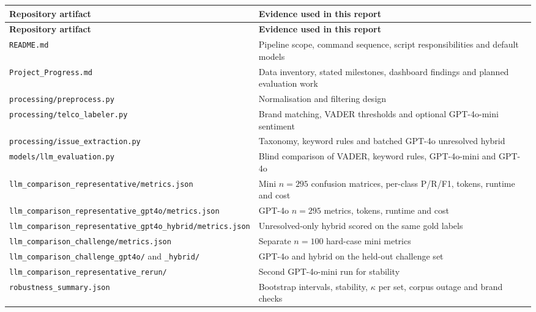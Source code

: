 \documentclass[11pt,a4paper]{article}
\begin{document}
\begin{longtable}{@{}p{}p{}@{}}
\toprule
\textbf{Repository artifact} & \textbf{Evidence used in this report} \\
\midrule
\endfirsthead
\toprule
\textbf{Repository artifact} & \textbf{Evidence used in this report} \\
\midrule
\endhead
\texttt{README.md} & Pipeline scope, command sequence, script responsibilities and default models \\
\texttt{Project\_\allowbreak{}Progress.md} & Data inventory, stated milestones, dashboard findings and planned evaluation work \\
\texttt{processing/\allowbreak{}preprocess.py} & Normalisation and filtering design \\
\texttt{processing/\allowbreak{}telco\_\allowbreak{}labeler.py} & Brand matching, VADER thresholds and optional GPT-4o-mini sentiment \\
\texttt{processing/\allowbreak{}issue\_\allowbreak{}extraction.py} & Taxonomy, keyword rules and batched GPT-4o unresolved hybrid \\
\texttt{models/\allowbreak{}llm\_\allowbreak{}evaluation.py} & Blind comparison of VADER, keyword rules, GPT-4o-mini and GPT-4o \\
\texttt{llm\_\allowbreak{}comparison\_\allowbreak{}representative/\allowbreak{}metrics.json} & Mini $n=295$ confusion matrices, per-class P/R/F1, tokens, runtime and cost \\
\texttt{llm\_\allowbreak{}comparison\_\allowbreak{}representative\_\allowbreak{}gpt4o/\allowbreak{}metrics.json} & GPT-4o $n=295$ metrics, tokens, runtime and cost \\
\texttt{llm\_\allowbreak{}comparison\_\allowbreak{}representative\_\allowbreak{}gpt4o\_\allowbreak{}hybrid/\allowbreak{}metrics.json} & Unresolved-only hybrid scored on the same gold labels \\
\texttt{llm\_\allowbreak{}comparison\_\allowbreak{}challenge/\allowbreak{}metrics.json} & Separate $n=100$ hard-case mini metrics \\
\texttt{llm\_\allowbreak{}comparison\_\allowbreak{}challenge\_\allowbreak{}gpt4o/\allowbreak{}} and \texttt{\_\allowbreak{}hybrid/\allowbreak{}} & GPT-4o and hybrid on the held-out challenge set \\
\texttt{llm\_\allowbreak{}comparison\_\allowbreak{}representative\_\allowbreak{}rerun/\allowbreak{}} & Second GPT-4o-mini run for stability \\
\texttt{robustness\_\allowbreak{}summary.json} & Bootstrap intervals, stability, $\kappa$ per set, corpus outage and brand checks \\

\end{longtable}
\end{document}
